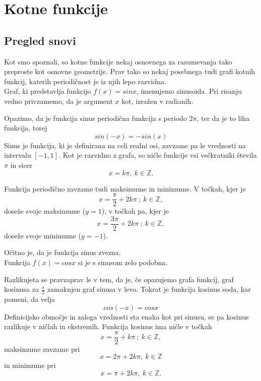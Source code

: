 
\chapter{Kotne funkcije}
\label{cha:sin-cos}

\section{Pregled snovi}
\label{sec:sin-cos-pregled-snovi}

Kot smo spoznali, so kotne funkcije nekaj osnovnega za razumevanja tako preproste kot osnovne geometrije. Prav tako so nekaj posebnega tudi grafi kotnih funkcij, katerih periodičnost je iz njih lepo razvidna. \\

Graf, ki predstavlja funkcijo $f(x) = sinx$, imenujemo sinusoida. Pri risanju vedno privzamemo, da je argument $x$ kot, izražen v radianih.


Opazimo, da je funkcija sinus periodična funkcija s periodo $2\pi$, ter da je to liha funkcija, torej
\[
sin(-x) = -sin(x)
\]
Sinus je funkcija, ki je definirana na celi realni osi, zavzame pa le vrednosti na intervalu $[-1, 1]$. Kot je razvidno z grafa, so ničle funkcije vsi večkratniki števila $\pi$ in sicer 
\[
x = k\pi, \:   k\in \mathbb{Z}.
\]

Funkcija periodično zavzame tudi maksimume in minimume. V točkah, kjer je 
\[
x = \frac{\pi}{2} + 2k\pi \: ; \: k \in \mathbb{Z},
\]
doseže svoje maksimume ($y = 1$), v točkah pa, kjer je  
\[
x = \frac{3\pi}{2} + 2k\pi \: ; \: k \in \mathbb{Z},
\] 
doseže svoje minimume ($y = -1$).

Očitno je, da je funkcija sinus zvezna.\\

Funkcija $f(x) = cosx$ si je s sinusom zelo podobna.

Razlikujeta se pravzaprav le v tem, da je, če opazujemo grafa funkcij, graf kosinusa za $\frac{\pi}{2}$ zamaknjen graf sinusa v levo. Tokrat je funkcija kosinus soda, kar pomeni, da velja
\[
cos(-x) = cosx
\]
Definicijsko območje in zaloga vrednosti sta enaka kot pri sinusu, se pa kosinus razlikuje v ničlah in ekstremih. Funkcija kosinus ima ničle v točkah 
\[
x = \frac{\pi}{2} + k\pi \: ; \: k \in \mathbb{Z},
\]
maksimume zavzame pri
\[
x =2\pi + 2 k\pi, \:   k\in \mathbb{Z}
\]
in minimume pri
\[
x =\pi + 2 k\pi, \:   k\in \mathbb{Z}.
\]





